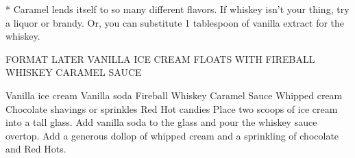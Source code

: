 * Caramel lends itself to so many different flavors.  If whiskey isn't
  your thing, try a liquor or brandy.  Or, you can substitute 1 tablespoon
  of vanilla extract for the whiskey.

FORMAT LATER
VANILLA ICE CREAM FLOATS WITH FIREBALL WHISKEY CARAMEL SAUCE

Vanilla ice cream
Vanilla soda
Fireball Whiskey Caramel Sauce
Whipped cream
Chocolate shavings or sprinkles
Red Hot candies
Place two scoops of ice cream into a tall glass.  Add vanilla soda to the glass and pour the whiskey sauce overtop.  Add a generous dollop of whipped cream and a sprinkling of chocolate and Red Hots.
